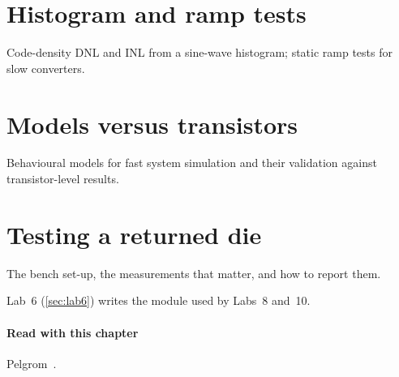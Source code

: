 \section{Histogram and ramp tests}\label{sec:ch22-3}
Code-density DNL and INL from a sine-wave histogram; static ramp tests for slow converters.

\section{Models versus transistors}\label{sec:ch22-4}
Behavioural models for fast system simulation and their validation against transistor-level results.

\section{Testing a returned die}\label{sec:ch22-5}
The bench set-up, the measurements that matter, and how to report them.

\begin{tryit}
Lab~6 (\cref{sec:lab6}) writes the  module used by Labs~8 and~10.
\end{tryit}

\paragraph{Read with this chapter} Pelgrom~\cite{pelgrom}.
